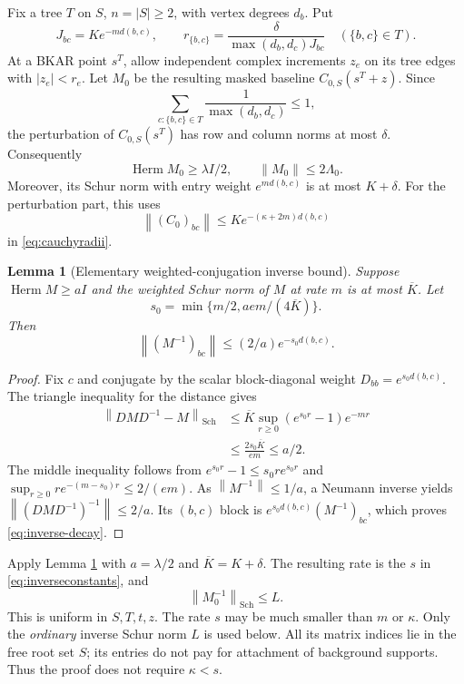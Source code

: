 \documentclass[11pt]{article}
\newtheorem{lemma}{Lemma}
\newcommand{\Herm}{\operatorname{Herm}}
\newcommand{\Sch}{\operatorname{Sch}}
\newcommand{\norm}[1]{\left\|#1\right\|}
\begin{document}
Fix a tree $T$ on $S$, $n=|S|\ge2$, with vertex degrees $d_b$.
Put
\begin{equation}
 J_{bc}=K e^{-m d(b,c)},\qquad
 r_{\{b,c\}}=
       \frac{\delta}{\max(d_b,d_c)J_{bc}}
                  \quad(\{b,c\}\in T).
 \label{eq:cauchyradii}
\end{equation}
At a BKAR point $s^T$, allow independent complex increments $z_e$
on its tree edges with $|z_e|<r_e$. Let $M_0$ be the resulting
masked baseline $C_{0,S}(s^T+z)$.
Since
\[
 \sum_{c:\{b,c\}\in T}\frac1{\max(d_b,d_c)}\le1,
\]
the perturbation of $C_{0,S}(s^T)$ has row and column norms at most
$\delta$. Consequently
\begin{equation}
 \Herm M_0\ge\lambda I/2,\qquad
 \norm{M_0}\le2\Lambda_0.
 \label{eq:deformedgap}
\end{equation}
Moreover, its Schur norm with entry weight $e^{m d(b,c)}$ is at most
$K+\delta$. For the perturbation part, this uses
\[
 \norm{(C_0)_{bc}}\le K e^{-(\kappa+2m)d(b,c)}
\]
in \eqref{eq:cauchyradii}.

\begin{lemma}[Elementary weighted-conjugation inverse bound]
\label{lem:inverse}
Suppose $\Herm M\ge aI$ and the weighted Schur norm of $M$ at rate
$m$ is at most $\overline K$. Let
\[
 s_0=\min\{m/2,aem/(4\overline K)\}.
\]
Then
\begin{equation}
 \norm{(M^{-1})_{bc}}\le(2/a)e^{-s_0d(b,c)}.
 \label{eq:inverse-decay}
\end{equation}
\end{lemma}

\begin{proof}
Fix $c$ and conjugate by the scalar block-diagonal weight
$D_{bb}=e^{s_0d(b,c)}$. The triangle inequality for the distance gives
\begin{align*}
 \norm{DMD^{-1}-M}_{\Sch}
 &\le \overline K\sup_{r\ge0}(e^{s_0r}-1)e^{-mr}\\
 &\le \frac{2s_0\overline K}{em}\le a/2.
\end{align*}
The middle inequality follows from
$e^{s_0r}-1\le s_0r e^{s_0r}$ and
$\sup_{r\ge0}r e^{-(m-s_0)r}\le2/(em)$.
As $\norm{M^{-1}}\le1/a$, a Neumann inverse yields
$\norm{(DMD^{-1})^{-1}}\le2/a$.
Its $(b,c)$ block is $e^{s_0d(b,c)}(M^{-1})_{bc}$,
which proves \eqref{eq:inverse-decay}.
\end{proof}

Apply Lemma \ref{lem:inverse} with $a=\lambda/2$ and
$\overline K=K+\delta$. The resulting rate is the $s$ in
\eqref{eq:inverseconstants}, and
\begin{equation}
 \norm{M_0^{-1}}_{\Sch}\le L.
 \label{eq:inverse-schur}
\end{equation}
This is uniform in $S,T,t,z$. The rate $s$ may be much smaller than
$m$ or $\kappa$. Only the \emph{ordinary} inverse Schur norm $L$ is
used below. All its matrix indices lie in the free root set $S$;
its entries do not pay for attachment of background supports.
Thus the proof does not require $\kappa<s$.
\end{document}

